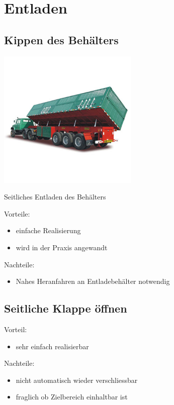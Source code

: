 \section{Entladen}
\subsection{Kippen des Behälters}

\includegraphics[width=0.5\textwidth]{Images/Entladen1.jpg}

Seitliches Entladen des Behälters

Vorteile:
\begin{itemize}
\item einfache Realisierung
\item wird in der Praxis angewandt
\end{itemize}

Nachteile:
\begin{itemize}
\item Nahes Heranfahren an Entladebehälter notwendig
\end{itemize}

\subsection{Seitliche Klappe öffnen}

Vorteil:
\begin{itemize}
\item sehr einfach realisierbar
\end{itemize}

\begin{flushleft}
Nachteile:
\end{flushleft}
\begin{itemize}
\item nicht automatisch wieder verschliessbar
\item fraglich ob Zielbereich einhaltbar ist
\end{itemize}

